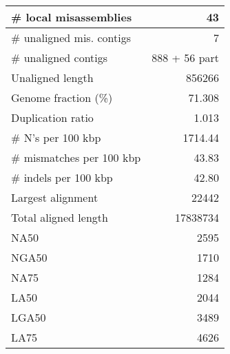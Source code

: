 \documentclass[12pt,a4paper]{article}
\begin{document}
\begin{table}[ht]
\begin{center}
\begin{tabular}{|l*{1}{|r}|}
\# local misassemblies & 43 \\ \hline
\# unaligned mis. contigs & 7 \\ \hline
\# unaligned contigs & 888 + 56 part \\ \hline
Unaligned length & 856266 \\ \hline
Genome fraction (\%) & 71.308 \\ \hline
Duplication ratio & 1.013 \\ \hline
\# N's per 100 kbp & 1714.44 \\ \hline
\# mismatches per 100 kbp & 43.83 \\ \hline
\# indels per 100 kbp & 42.80 \\ \hline
Largest alignment & 22442 \\ \hline
Total aligned length & 17838734 \\ \hline
NA50 & 2595 \\ \hline
NGA50 & 1710 \\ \hline
NA75 & 1284 \\ \hline
LA50 & 2044 \\ \hline
LGA50 & 3489 \\ \hline
LA75 & 4626 \\ \hline
\end{tabular}
\end{center}
\end{table}
\end{document}
